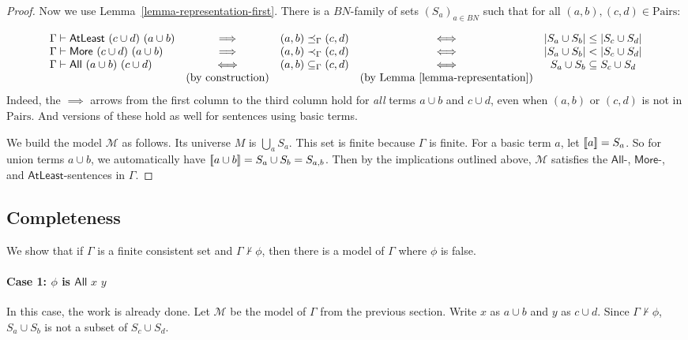 \documentclass[letterpaper]{article} %
\theoremstyle{definition}
\newcommand{\semantics}[1]{[\![\mbox{\em $ #1 $\/}]\!]}
\newcommand{\Model}{\mathcal{M}}
\newcommand{\proves}{\vdash}
\newcommand{\All}[2]{\mathsf{All}\,\,#1\,\,#2}
\newcommand{\Atleast}[2]{\mathsf{AtLeast}\,\,#1\,\,#2}
\newcommand{\More}[2]{\mathsf{More}\,\,#1\,\,#2}
\newcommand{\AllNoArgs}{\mathsf{All}}
\newcommand{\AtleastNoArgs}{\mathsf{AtLeast}}
\newcommand{\MoreNoArgs}{\mathsf{More}}
\newcommand{\Pairs}{\mbox{Pairs}}
\newcommand{\provsub}{\subseteq_{\Gamma}}
\newcommand{\provextended}{\preceq_{\Gamma}}
\newcommand{\provextendedstrict}{\prec_{\Gamma}}
\begin{document}
{\begin{proof}
Now we use Lemma~\ref{lemma-representation-first}.
There is a $BN$-family of sets $(S_a)_{a\in BN}$ such that for all 
$(a,b),(c,d) \in \Pairs$:

\[
\begin{array}{lcccc}
\Gamma \proves \Atleast{(c \cup d)}{(a \cup b)} & \implies & 
    (a,b) \provextended (c,d) & \iff & 
    |S_a \cup S_b| \le |S_c \cup S_d|\\
\Gamma \proves \More{(c \cup d)}{(a \cup b)} & \implies & 
    (a,b) \provextendedstrict (c,d) & \iff & 
    |S_a \cup S_b| < |S_c \cup S_d|\\
\Gamma \proves \All{(a \cup b)}{(c \cup d)} & \iff & 
    (a,b) \provsub (c,d) & \iff & 
    S_a \cup S_b \subseteq S_c \cup S_d\\
& (\textrm{by construction}) & & (\textrm{by Lemma \ref{lemma-representation}}) & 
\end{array}
\]
Indeed, the $\implies$ arrows from the first column to the third column
hold for \emph{all} terms $a\cup b$ and $c\cup d$, even when $(a,b)$ or 
$(c,d)$ is not in $\Pairs$.  And versions of these hold as well for 
sentences using basic terms.


We build the model $\Model$ as follows.  Its universe $M$ is  $\bigcup_{a} S_a$.
This set is finite because $\Gamma$ is finite.
For a basic term  $a$, let $\semantics{a} = S_{a}$. 
So  for union terms $a\cup b$, we
automatically
have $\semantics{a\cup b} = S_{a} \cup S_{b} = S_{a,b}$.
Then by the implications outlined above, $\Model$ satisfies the $\AllNoArgs$-, $\MoreNoArgs$-, and $\AtleastNoArgs$-sentences in $\Gamma$. 
\end{proof}
 
 \subsection{Completeness}
 
 We show that if $\Gamma$ is a finite consistent set and $\Gamma\not\proves\phi$,
 then there is a model of $\Gamma$ where $\phi$ is false.
 
 \paragraph{Case 1: $\phi$ is $\All{x}{y}$}
 In this case, the work is already done.   Let $\Model$ be the model of $\Gamma$ from
 the previous section. Write $x$ as $a\cup b$ and $y$ as $c\cup d$.
 Since $\Gamma\not\proves\phi$, $S_a\cup S_b$ is not a subset of $S_c\cup S_d$.

}
\end{document}
